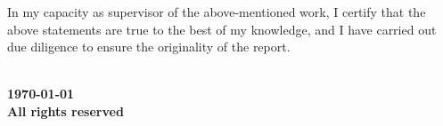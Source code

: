 \vspace{20mm}
 \qquad
\vspace{20mm}

\noindent In my capacity as supervisor of the above-mentioned work, I certify
that the above statements are true to the best of my knowledge, and
I have carried out due diligence to ensure the originality of the report.

\vspace{20mm}

 \qquad


\blankpage

\vspace*{\fill}
\begin{center}
\large\bf \textcopyright \ \myname\\
\large\bf \monthyeardate\today\\
\large\bf All rights reserved
\end{center}
\vspace*{\fill}
\thispagestyle{empty}


%



